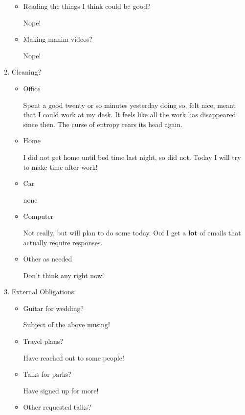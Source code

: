\documentclass[12pt]{article}
\renewcommand{\,}{\textsuperscript{,}}
\begin{document}
\begin{enumerate}
\begin{itemize}
\item Reading the things I think could be good?

Nope!

\item Making manim videos?

Nope!

\end{itemize}

\item Cleaning?

\begin{itemize}

\item Office

Spent a good twenty or so minutes yesterday doing so, felt nice, meant that I could work at my desk. It feels like all the work has disappeared since then.  
The curse of entropy rears its head again.

\item Home

I did not get home until bed time last night, so did not. Today I will try to make time after work!

\item Car

none

\item Computer

Not really, but will plan to do some today. Oof I get a \textbf{lot} of emails that actually require responses.

\item Other as needed

Don't think any right now!

\end{itemize}

\item External Obligations:

\begin{itemize}

\item Guitar for wedding?

Subject of the above musing!

\item Travel plans?

Have reached out to some people!

\item Talks for parks?

Have signed up for more!

\item Other requested talks?


\end{itemize}
\end{enumerate}
\end{document}
